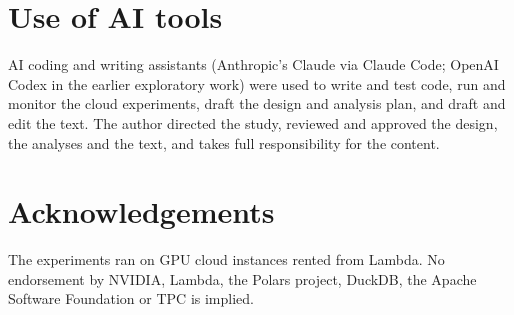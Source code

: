 \documentclass[11pt]{article}
\begin{document}
\section*{Use of AI tools}
AI coding and writing assistants (Anthropic's Claude via Claude Code; OpenAI
Codex in the earlier exploratory work) were used to write and test code, run
and monitor the cloud experiments, draft the design and analysis plan, and
draft and edit the text. The author directed the study, reviewed and approved
the design, the analyses and the text, and takes full responsibility for the
content.

\section*{Acknowledgements}
The experiments ran on GPU cloud instances rented from Lambda. No endorsement by NVIDIA, Lambda,
the Polars project, DuckDB, the Apache Software Foundation or TPC is implied.



\end{document}
